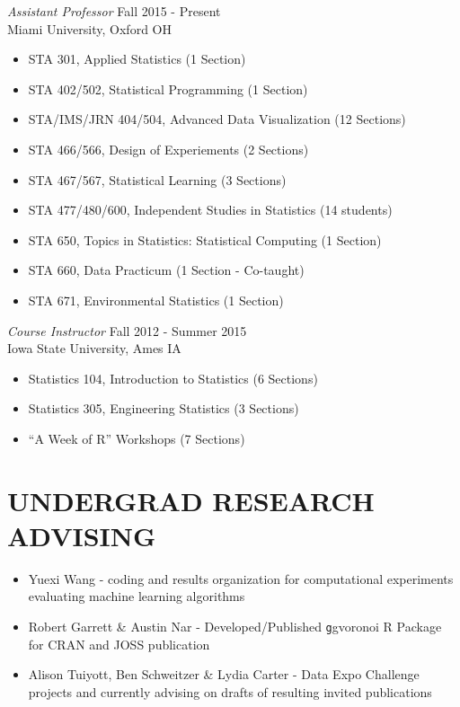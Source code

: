 \documentclass[margin, 10pt]{res}\usepackage[]{graphicx}\usepackage[]{color}
\begin{document}
\begin{resume}
{\sl Assistant Professor} \hfill Fall 2015 - Present \\
Miami University, Oxford OH
\begin{itemize} \itemsep -2pt %
\item STA 301, Applied Statistics (1 Section)
\item STA 402/502, Statistical Programming (1 Section)
\item STA/IMS/JRN 404/504, Advanced Data Visualization (12 Sections)
\item STA 466/566, Design of Experiements (2 Sections)
\item STA 467/567, Statistical Learning (3 Sections)
\item STA 477/480/600, Independent Studies in Statistics (14 students)
\item STA 650, Topics in Statistics: Statistical Computing (1 Section)
\item STA 660, Data Practicum (1 Section - Co-taught)
\item STA 671, Environmental Statistics  (1 Section)
\end{itemize}

{\sl Course Instructor} \hfill Fall 2012 - Summer 2015 \\
Iowa State University, Ames IA
\begin{itemize} \itemsep -2pt %
\item Statistics 104, Introduction to Statistics (6 Sections)
\item Statistics 305, Engineering Statistics (3 Sections)
\item  ``A Week of R'' Workshops (7 Sections)
\end{itemize} 



  
\section{UNDERGRAD RESEARCH ADVISING}

\begin{itemize} \itemsep -2pt %
  \item Yuexi Wang - coding and results organization for computational experiments evaluating machine learning algorithms
  \item Robert Garrett \& Austin Nar - Developed/Published {\texttt ggvoronoi} R Package for CRAN and JOSS publication
  \item Alison Tuiyott, Ben Schweitzer \& Lydia Carter - Data Expo Challenge projects and currently advising on drafts of resulting invited publications 
\end{itemize}


\end{resume}
\end{document}

